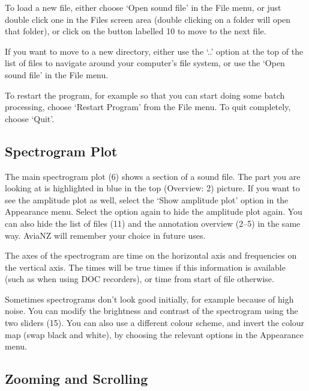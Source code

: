 \documentclass{article}
\begin{document}
To load a new file, either choose `Open sound file' in the File menu, or just double click one in the Files screen area (double clicking on a folder will open that folder), or click on the button labelled 10 to move to the next file. 

If you want to move to a new directory, either use the `..' option at the top of the list of files to navigate around your computer's file system, or use the  `Open sound file' in the File menu.

To restart the program, for example so that you can start doing some batch processing, choose `Restart Program' from the File menu. To quit completely, choose `Quit'. 


\subsection{Spectrogram Plot}

The main spectrogram plot (6) shows a section of a sound file. The part you are looking at is highlighted in blue in the top (Overview: 2) picture. If you want to see the amplitude plot as well, select the `Show amplitude plot' option in the Appearance menu. Select the option again to hide the amplitude plot again. You can also hide the list of files (11) and the annotation overview (2--5) in the same way. AviaNZ will remember your choice in future uses.

The axes of the spectrogram are time on the horizontal axis and frequencies on the vertical axis. The times will be true times if this information is available (such as when using DOC recorders), or time from start of file otherwise. 

Sometimes spectrograms don't look good initially, for example because of high noise. You can modify the brightness and contrast of the spectrogram using the two sliders (15). You can also use a different colour scheme, and invert the colour map (swap black and white), by choosing the relevant options in the Appearance menu. 

\subsection{Zooming and Scrolling}
\end{document}
